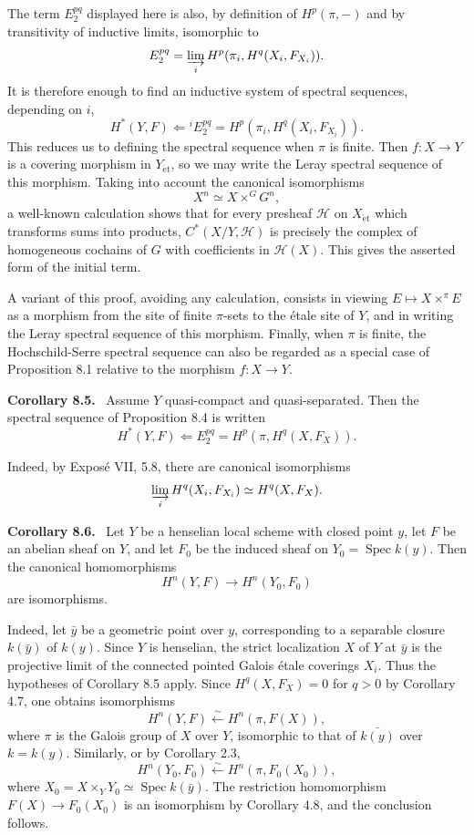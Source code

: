 \documentclass[11pt]{article}
\newcommand{\Hh}{\mathcal{H}}
\newcommand{\Spec}{\operatorname{Spec}}
\newcommand{\et}{\mathrm{\acute{e}t}}
\newenvironment{statement}[1]{\par\medskip\noindent\textbf{#1.}\ }{\par\medskip}
\begin{document}
The term \(E_2^{pq}\) displayed here is also, by definition of \(H^p(\pi,-)\) and by transitivity of inductive limits, isomorphic to
\[
E_2^{pq}=\varinjlim_i H^p(\pi_i,H^q(X_i,F_{X_i})).
\]
It is therefore enough to find an inductive system of spectral sequences, depending on \(i\),
\[
H^*(Y,F)\Longleftarrow {}^iE_2^{pq}=H^p(\pi_i,H^q(X_i,F_{X_i})).
\]
This reduces us to defining the spectral sequence when \(\pi\) is finite. Then \(f:X\to Y\) is a covering morphism in \(Y_{\et}\), so we may write the Leray spectral sequence of this morphism. Taking into account the canonical isomorphisms
\[
X^n\simeq X\times^G G^n,
\]
a well-known calculation shows that for every presheaf \(\Hh\) on \(X_{\et}\) which transforms sums into products, \(C^*(X/Y,\Hh)\) is precisely the complex of homogeneous cochains of \(G\) with coefficients in \(\Hh(X)\). This gives the asserted form of the initial term.

A variant of this proof, avoiding any calculation, consists in viewing \(E\mapsto X\times^\pi E\) as a morphism from the site of finite \(\pi\)-sets to the \'etale site of \(Y\), and in writing the Leray spectral sequence of this morphism. Finally, when \(\pi\) is finite, the Hochschild-Serre spectral sequence can also be regarded as a special case of Proposition 8.1 relative to the morphism \(f:X\to Y\).

\begin{statement}{Corollary 8.5}
Assume \(Y\) quasi-compact and quasi-separated. Then the spectral sequence of Proposition 8.4 is written
\[
H^*(Y,F)\Longleftarrow E_2^{pq}=H^p(\pi,H^q(X,F_X)).
\]
\end{statement}

Indeed, by Expos\'e VII, 5.8, there are canonical isomorphisms
\[
\varinjlim_iH^q(X_i,F_{X_i})\simeq H^q(X,F_X).
\]

\begin{statement}{Corollary 8.6}
Let \(Y\) be a henselian local scheme with closed point \(y\), let \(F\) be an abelian sheaf on \(Y\), and let \(F_0\) be the induced sheaf on \(Y_0=\Spec k(y)\). Then the canonical homomorphisms
\[
H^n(Y,F)\longrightarrow H^n(Y_0,F_0)
\]
are isomorphisms.
\end{statement}

Indeed, let \(\bar y\) be a geometric point over \(y\), corresponding to a separable closure \(k(\bar y)\) of \(k(y)\). Since \(Y\) is henselian, the strict localization \(X\) of \(Y\) at \(\bar y\) is the projective limit of the connected pointed Galois \'etale coverings \(X_i\). Thus the hypotheses of Corollary 8.5 apply. Since \(H^q(X,F_X)=0\) for \(q>0\) by Corollary 4.7, one obtains isomorphisms
\[
H^n(Y,F)\xleftarrow{\sim}H^n(\pi,F(X)),
\]
where \(\pi\) is the Galois group of \(X\) over \(Y\), isomorphic to that of \(\bar{k(y)}\) over \(k=k(y)\). Similarly, or by Corollary 2.3,
\[
H^n(Y_0,F_0)\xleftarrow{\sim}H^n(\pi,F_0(X_0)),
\]
where \(X_0=X\times_YY_0\simeq\Spec k(\bar y)\). The restriction homomorphism \(F(X)\to F_0(X_0)\) is an isomorphism by Corollary 4.8, and the conclusion follows.
\end{document}
